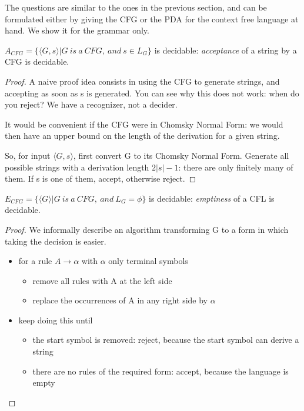 The questions are similar to the ones in the previous section, and can
be formulated either by giving the CFG or the PDA for the context free
language at hand. We show it for the grammar only.

\begin{theorem} \label{acfg}
$A_{CFG} = \{\langle G,s \rangle|G~is~a~CFG,~and~s \in L_G\}$ is
    decidable: {\em acceptance} of a string by a CFG is decidable.
\end{theorem}
\begin{proof}
A naive proof idea consists in using the CFG to generate strings, and
accepting as soon as s is generated. You can see why this does not work:
when do you reject? We have a recognizer, not a decider.

It would be convenient if the CFG were in Chomsky Normal Form: we
would then have an upper bound on the length of the derivation for a
given string.

So, for input $\langle G,s \rangle$, first convert G to its Chomsky
Normal Form. Generate all possible strings with a derivation length
$2|s|-1$: there are only finitely many of them. If s is one of them,
accept, otherwise reject.
\end{proof}

\begin{theorem}
$E_{CFG} = \{\langle G \rangle|G~is~a~CFG,~and~L_G = \phi\}$ is decidable: {\em emptiness} of a CFL is decidable.
\end{theorem}
\begin{proof}
We informally describe an algorithm transforming G to a form in which
taking the decision is easier.
\begin{itemize}
\item
for a rule $A \rightarrow \alpha$ with $\alpha$ only terminal symbols
\begin{itemize}
\item remove all rules with A at the left side
\item replace the occurrences of A in any right side by $\alpha$
\end{itemize}


\item
keep doing this until
\begin{itemize}
\item the start symbol is removed: reject, because the start symbol
  can derive a string
\item there are no rules of the required form: accept, because the
  language is empty
\end{itemize}
\end{itemize}
\end{proof}

